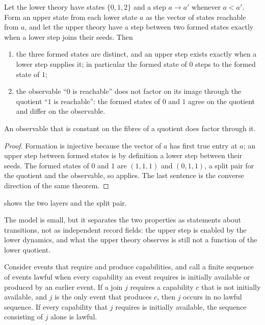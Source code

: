 \begin{proposition}
\label{prop:enablement-model}
Let the lower theory have states $\{0,1,2\}$ and a step $a\to a'$ whenever $a<a'$. Form an upper
state from each lower state $a$ as the vector of states reachable from $a$, and let the upper
theory have a step between two formed states exactly when a lower step joins their seeds. Then
\begin{enumerate}
  \item the three formed states are distinct, and an upper step exists exactly when a lower step
        supplies it; in particular the formed state of $0$ steps to the formed state of $1$;
  \item the observable ``$0$ is reachable'' does not factor on its image through the quotient
        ``$1$ is reachable'': the formed states of $0$ and $1$ agree on the quotient and differ
        on the observable.
\end{enumerate}
An observable that is constant on the fibres of a quotient does factor through it.
\end{proposition}

\begin{proof}
Formation is injective because the vector of $a$ has first true entry at $a$; an upper step
between formed states is by definition a lower step between their seeds. The formed states of
$0$ and $1$ are $(1,1,1)$ and $(0,1,1)$, a split pair for the quotient and the observable, so
 applies. The last sentence is the converse direction of the same
theorem.
\end{proof}

 shows the two layers and the split pair.



The model is small, but it separates the two properties as statements about transitions, not
as independent record fields: the upper step is enabled by the lower dynamics, and what the
upper theory observes is still not a function of the lower quotient.

\begin{proposition}
\label{prop:no-free-join}
Consider events that require and produce capabilities, and call a finite sequence of events
lawful when every capability an event requires is initially available or produced by an earlier
event. If a join $j$ requires a capability $c$ that is not initially available, and $j$ is the
only event that produces $c$, then $j$ occurs in no lawful sequence. If every capability that $j$
requires is initially available, the sequence consisting of $j$ alone is lawful.
\end{proposition}

